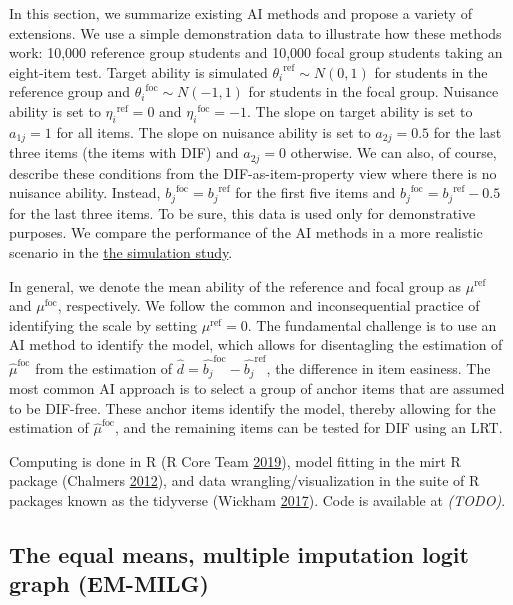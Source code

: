 \documentclass[
  11pt,
]{article}
\begin{document}
In this section, we summarize existing AI methods and propose a variety of extensions. We use a simple demonstration data to illustrate how these methods work: 10,000 reference group students and 10,000 focal group students taking an eight-item test. Target ability is simulated \({\theta_i}^{\text{ref}} \sim N(0,1)\) for students in the reference group and \({\theta_i}^{\text{foc}} \sim N(-1,1)\) for students in the focal group. Nuisance ability is set to \({\eta_i}^{\text{ref}} = 0\) and \({\eta_i}^{\text{foc}} = -1\). The slope on target ability is set to \(a_{1j} = 1\) for all items. The slope on nuisance ability is set to \(a_{2j} = 0.5\) for the last three items (the items with DIF) and \(a_{2j} = 0\) otherwise. We can also, of course, describe these conditions from the DIF-as-item-property view where there is no nuisance ability. Instead, \({b_j}^{\text{foc}} = {b_j}^{\text{ref}}\) for the first five items and \({b_j}^{\text{foc}} = {b_j}^{\text{ref}} - 0.5\) for the last three items. To be sure, this data is used only for demonstrative purposes. We compare the performance of the AI methods in a more realistic scenario in the \protect\hyperlink{simstudy}{the simulation study}.

In general, we denote the mean ability of the reference and focal group as \(\mu^\text{ref}\) and \(\mu^\text{foc}\), respectively. We follow the common and inconsequential practice of identifying the scale by setting \(\mu^\text{ref} = 0\). The fundamental challenge is to use an AI method to identify the model, which allows for disentagling the estimation of \(\hat\mu^\text{foc}\) from the estimation of \(\hat d = \hat{b_j}^{\text{foc}} - \hat{b_j}^{\text{ref}}\), the difference in item easiness. The most common AI approach is to select a group of anchor items that are assumed to be DIF-free. These anchor items identify the model, thereby allowing for the estimation of \(\hat\mu^\text{foc}\), and the remaining items can be tested for DIF using an LRT.

Computing is done in R (R Core Team \protect\hyperlink{ref-rcore}{2019}), model fitting in the mirt R package (Chalmers \protect\hyperlink{ref-chalmers2012mirt}{2012}), and data wrangling/visualization in the suite of R packages known as the tidyverse (Wickham \protect\hyperlink{ref-tidy}{2017}). Code is available at \emph{(TODO)}.

\hypertarget{emmilg}{%
\subsection{The equal means, multiple imputation logit graph (EM-MILG)}\label{emmilg}}
\end{document}
